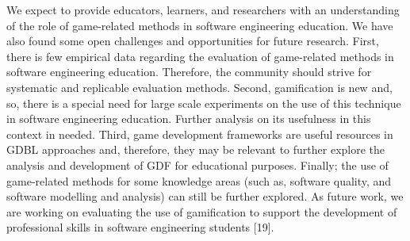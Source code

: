 We expect to provide educators, learners, and researchers with an understanding of the role of game-related methods in software engineering education. We have also found some open challenges and opportunities for future research. First, there is few empirical data regarding the evaluation of game-related methods in software engineering education. Therefore, the community should strive for systematic and replicable evaluation methods. Second, gamification is new and, so, there is a special need for large scale experiments on the use of this technique in software engineering education. Further analysis on its usefulness in this context in needed. Third, game development frameworks are useful resources in GDBL approaches and, therefore, they may be relevant to further explore the analysis and development of GDF for educational purposes. Finally; the use of game-related methods for some knowledge areas (such as, software quality, and software modelling and analysis) can still be further explored. As future work, we are working on evaluating the use of gamification to support the development of professional skills in software engineering students [19].


